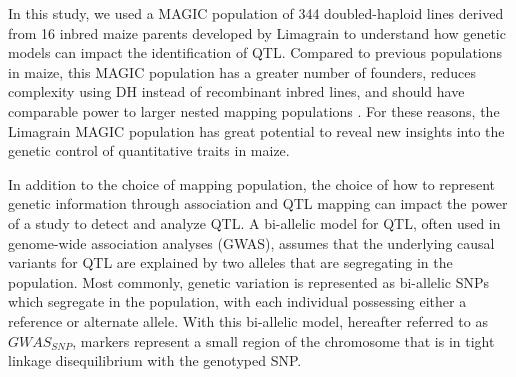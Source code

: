 \documentclass[article,9pt,twocolumn,twoside]{rilabRxiv}
\begin{document}
In this study, we used a MAGIC population of 344 doubled-haploid lines derived from 16 inbred maize parents developed by Limagrain to understand how genetic models can impact the identification of QTL.
Compared to previous populations in maize, this MAGIC population has a greater number of founders, reduces complexity using DH instead of recombinant inbred lines, and should have comparable power to larger nested mapping  populations \citep{DellAcqua,Yu2}.
For these reasons, the Limagrain MAGIC population has great potential to reveal new insights into the genetic control of quantitative traits in maize.

In addition to the choice of mapping population, the choice of how to represent genetic information through association and QTL mapping can impact the power of a study to detect and analyze QTL.
A bi-allelic model for QTL, often used in genome-wide association analyses (GWAS), assumes that the underlying causal variants for QTL are explained by two alleles that are segregating in the population.
Most commonly, genetic variation is represented as bi-allelic SNPs which segregate in the population, with each individual possessing either a reference or alternate allele.
With this bi-allelic model, hereafter referred to as $GWAS_{SNP}$, markers represent a small region of the chromosome that is in tight linkage disequilibrium with the genotyped SNP.
\end{document}
